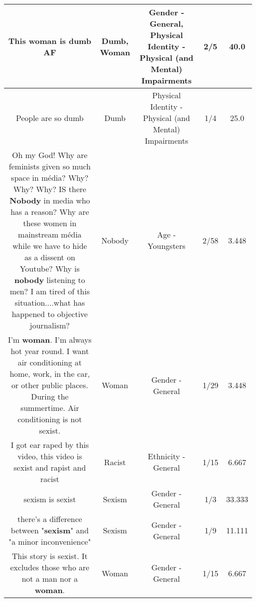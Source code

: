\documentclass[11pt]{article}
\newlength\mylength
\begin{document}
\begin{center}
\begin{longtable}{|C{.65\mylength}|C{.30\mylength}|C{.12\mylength}|C{.12\mylength}|C{.12\mylength}|}
  \small This \textbf{woman} is \textbf{dumb} AF\normalsize   & Dumb, Woman & Gender - General, Physical Identity - Physical (and Mental) Impairments & 2/5 & 40.0 \\  \hline
  \small People are so dumb\normalsize   & Dumb & Physical Identity - Physical (and Mental) Impairments & 1/4 & 25.0 \\  \hline
  \small Oh my God! Why are feminists given so much space in média? Why? Why? Why? IS there \textbf{Nobody} in media who has a reason? Why are these women in mainstream média while we have to hide as a dissent on Youtube? Why is \textbf{nobody} listening to men? I am tired of this situation....what has happened to objective journalism?\normalsize   & Nobody & Age - Youngsters & 2/58 & 3.448 \\  \hline
  \small I'm \textbf{woman}. I'm always hot year round. I want air conditioning at home, work, in the car, or other public places. During the summertime. Air conditioning is not sexist.\normalsize   & Woman & Gender - General & 1/29 & 3.448 \\  \hline
  \small I got ear raped by this video, this video is sexist and rapist and racist\normalsize   & Racist & Ethnicity - General & 1/15 & 6.667 \\  \hline
  \small sexism is sexist\normalsize   & Sexism & Gender - General & 1/3 & 33.333 \\  \hline
  \small there's a difference between "\textbf{sexism}" and "a minor inconvenience"\normalsize   & Sexism & Gender - General & 1/9 & 11.111 \\  \hline
  \small This story is sexist. It excludes those who are not a man nor a \textbf{woman}.\normalsize   & Woman & Gender - General & 1/15 & 6.667 \\  \hline

\end{longtable}
\end{center}
\end{document}
